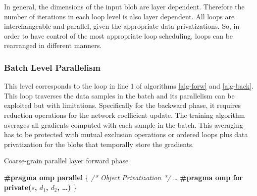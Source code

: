 In general, the dimensions of the input blob are layer dependent. Therefore the number of iterations in each loop level is also layer dependent. All loops are 
interchangeable and parallel, given the appropriate data privatizations. 
So, in order to have control of the most appropriate loop scheduling, 
loops can be rearranged in different manners. 

\subsubsection{Batch Level Parallelism}
This level corresponds to the loop in line 1 of algorithms \ref{alg-forw}
and \ref{alg-back}. 
This loop traverses the data samples in the batch and its parallelism 
can be exploited but with limitations. 
Specifically for the backward phase, it requires reduction operations 
for the network coefficient update. The training algorithm averages all 
gradients computed with each sample in the batch. This averaging
has to be protected with mutual exclusion operations or ordered
loops plus data privatization for the blobs that temporally store the
gradients. 



\begin{algorithm}
\caption{Coarse-grain parallel layer forward phase}
\label{alg-par-forw}
\textbf{\#pragma omp parallel}
\{
\BlankLine
\emph{/* Object Privatization */}
\dots
\BlankLine
\textbf{\#pragma omp for private($s$, $d_1$, $d_2$, \dots)}
\BlankLine
{}
\}
\end{algorithm}

